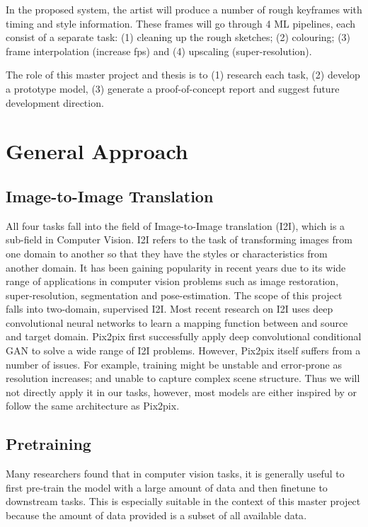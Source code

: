 In the proposed system, the artist will produce a number of rough keyframes with timing and style information. These frames will go through 4 ML pipelines, each consist of a separate task: (1) cleaning up the rough sketches; (2) colouring; (3) frame interpolation (increase fps) and (4) upscaling (super-resolution).

The role of this master project and thesis is to (1) research each task, (2) develop a prototype model, (3) generate a proof-of-concept report and suggest future development direction.


\section{General Approach}
\subsection{Image-to-Image Translation}
All four tasks fall into the field of Image-to-Image translation (I2I), which is a sub-field in Computer Vision. I2I refers to the task of transforming images from one domain to another so that they have the styles or characteristics from another domain. It has been gaining popularity in recent years due to its wide range of applications in computer vision problems such as image restoration, super-resolution, segmentation and pose-estimation. The scope of this project falls into two-domain, supervised I2I\cite{pangImagetoImageTranslationMethods2021}. Most recent research on I2I uses deep convolutional neural networks to learn a mapping function between and source and target domain. Pix2pix\cite{isolaImagetoImageTranslationConditional2018} first successfully apply deep convolutional conditional GAN to solve a wide range of I2I problems. However, Pix2pix itself suffers from a number of issues. For example, training might be unstable and error-prone as resolution increases\cite{wangHighResolutionImageSynthesis2018}; and unable to capture complex scene structure\cite{tangMultiChannelAttentionSelection2019}. Thus we will not directly apply it in our tasks, however, most models are either inspired by or follow the same architecture as Pix2pix.

\subsection{Pretraining}
Many researchers found that in computer vision tasks, it is generally useful to first pre-train the model with a large amount of data and then finetune to downstream tasks\cite{baoBEiTBERTPreTraining2021, weiMaskedFeaturePrediction2021, newellHowUsefulSelfSupervised2020}. This is especially suitable in the context of this master project because the amount of data provided is a subset of all available data\cite{newellHowUsefulSelfSupervised2020}.

